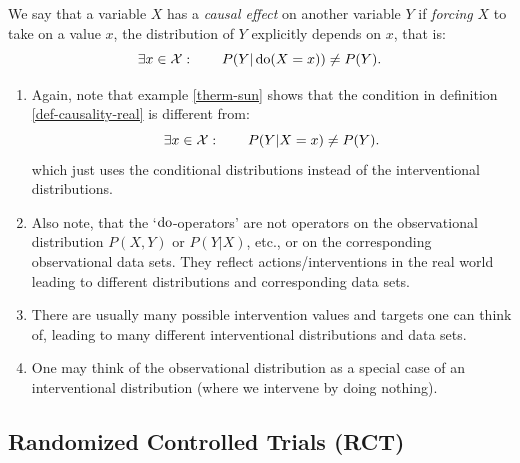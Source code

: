 \begin{Def}
    \label{def-causality-real}
    We say that a variable $X$ has a \emph{causal effect} on another variable $Y$ if
    \emph{forcing} $X$ to take on a value $x$, the distribution of $Y$ explicitly depends on $x$, that is:
    \[ \exists x \in \mathcal{X}:\qquad P(Y|\operatorname{do}(X=x)) \neq P(Y). \]
\end{Def}

\begin{Rem}
    \begin{enumerate}
        \item 
    Again, note that example \ref{therm-sun} shows that the condition in definition \ref{def-causality-real} is different from:
    \[ \exists x \in \mathcal{X}:\qquad P(Y|X=x) \neq P(Y). \]
    which just uses the conditional distributions instead of the interventional distributions.
        \item Also note, that the `$\operatorname{do}$-operators' are not operators on the observational distribution $P(X,Y)$ or $P(Y|X)$, etc., or on the corresponding observational data sets. They reflect actions/interventions in the real world leading to different distributions and corresponding data sets. 
        \item There are usually many possible intervention values and targets one can think of, leading to many different interventional distributions and data sets.
        \item One may think of the observational distribution as a special case of an interventional distribution (where we intervene by doing nothing).
    \end{enumerate}
\end{Rem}

\subsection{Randomized Controlled Trials (RCT)} %

